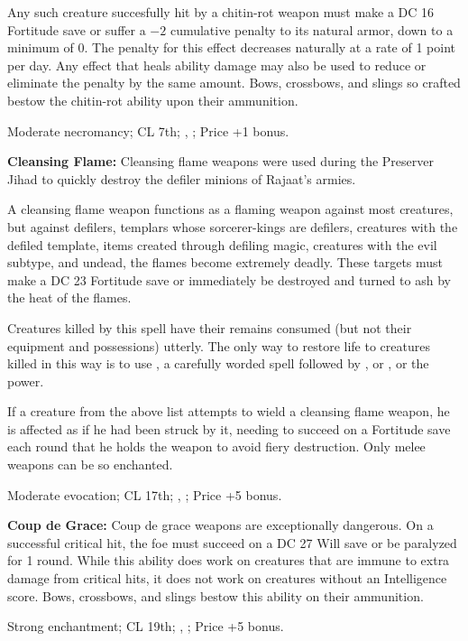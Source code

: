 Any such creature succesfully hit by a chitin-rot weapon must make a DC 16 Fortitude save or suffer a $-2$ cumulative penalty to its natural armor, down to a minimum of 0. The penalty for this effect decreases naturally at a rate of 1 point per day. Any effect that heals ability damage may also be used to reduce or eliminate the penalty by the same amount. Bows, crossbows, and slings so crafted bestow the chitin-rot ability upon their ammunition.

Moderate necromancy; CL 7th; , ; Price +1 bonus.

\textbf{Cleansing Flame:} Cleansing flame weapons were used during the Preserver Jihad to quickly destroy the defiler minions of Rajaat's armies.

A cleansing flame weapon functions as a flaming weapon against most creatures, but against defilers, templars whose sorcerer-kings are defilers, creatures with the defiled template, items created through defiling magic, creatures with the evil subtype, and undead, the flames become extremely deadly. These targets must make a DC 23 Fortitude save or immediately be destroyed and turned to ash by the heat of the flames.

Creatures killed by this spell have their remains consumed (but not their equipment and possessions) utterly. The only way to restore life to creatures killed in this way is to use , a carefully worded  spell followed by , or , or the  power.

If a creature from the above list attempts to wield a cleansing flame weapon, he is affected as if he had been struck by it, needing to succeed on a Fortitude save each round that he holds the weapon to avoid fiery destruction. Only melee weapons can be so enchanted.

Moderate evocation; CL 17th; , ; Price +5 bonus.

\textbf{Coup de Grace:} Coup de grace weapons are exceptionally dangerous. On a successful critical hit, the foe must succeed on a DC 27 Will save or be paralyzed for 1 round. While this ability does work on creatures that are immune to extra damage from critical hits, it does not work on creatures without an Intelligence score. Bows, crossbows, and slings bestow this ability on their ammunition.

Strong enchantment; CL 19th; , ; Price +5 bonus.

